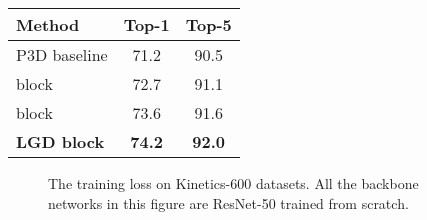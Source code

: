 \documentclass[10pt,twocolumn,letterpaper]{article}
\begin{document}
\begin{table}
\begin{minipage}{0.23\textwidth}
\begin{tabular}{@{~}l@{~}|@{~}c@{~}|@{~}c@{~}}
\end{tabular}
\end{minipage}
\begin{minipage}{0.23\textwidth}
\small
\centering
\begin{tabular}{@{~}l@{~}|@{~}c@{~}|@{~}c@{~}} \hline
\begin{minipage}{1.8cm}\vspace{0.12cm} \textbf{Method} \vspace{0.12cm}\end{minipage}     & \textbf{Top-1} & \textbf{Top-5} \\ \hline
\begin{minipage}{1.8cm}\vspace{0.12cm} P3D baseline \vspace{0.12cm}\end{minipage}     & 71.2 & 90.5 \\
\begin{minipage}{1.8cm}\vspace{0.12cm} block \vspace{0.12cm}\end{minipage}     & 72.7 & 91.1 \\
\begin{minipage}{1.8cm}\vspace{0.12cm} block \vspace{0.12cm}\end{minipage}     & 73.6 & 91.6 \\ \hline
\begin{minipage}{1.8cm}\vspace{0.12cm} \textbf{LGD block} \vspace{0.12cm}\end{minipage}     & \textbf{74.2} & \textbf{92.0} \\ \hline
\end{tabular}
\end{minipage}
\vspace{-0.10in}
\label{tab:block}
\end{table}

\begin{figure}[!tb]
   \centering
   \caption{\small The training loss on Kinetics-600 datasets. All the backbone networks in this figure are ResNet-50 trained from scratch.}
   \label{fig:loss}
   \vspace{-0.20in}
\end{figure}
\end{document}
